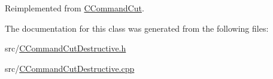 Reimplemented from \hyperlink{classCCommandCut_a18065504c797f4fde787a7dfd46bce74}{C\+Command\+Cut}.



The documentation for this class was generated from the following files\+:\begin{DoxyCompactItemize}
\item 
src/\hyperlink{CCommandCutDestructive_8h}{C\+Command\+Cut\+Destructive.\+h}\item 
src/\hyperlink{CCommandCutDestructive_8cpp}{C\+Command\+Cut\+Destructive.\+cpp}\end{DoxyCompactItemize}

